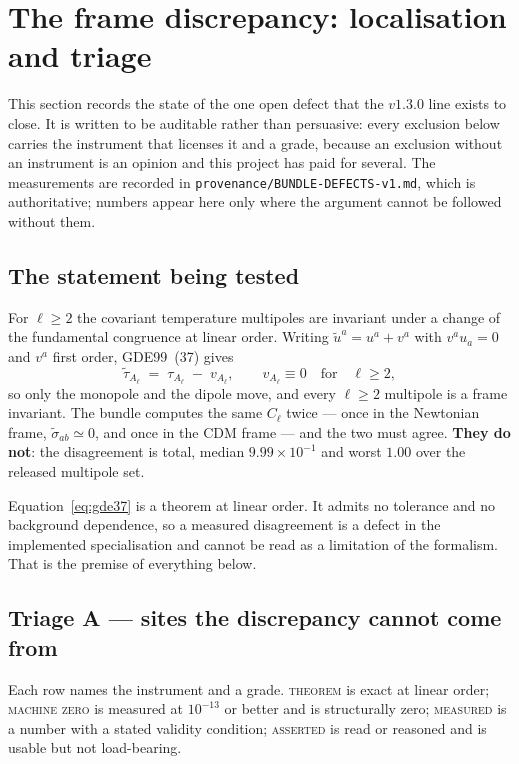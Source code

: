 \section{The frame discrepancy: localisation and triage}
\label{sec:frame-discrepancy}

\noindent
This section records the state of the one open defect that the $v1.3.0$ line
exists to close. It is written to be auditable rather than persuasive: every
exclusion below carries the instrument that licenses it and a grade, because
an exclusion without an instrument is an opinion and this project has paid for
several. The measurements are recorded in
\texttt{provenance/BUNDLE-DEFECTS-v1.md}, which is authoritative; numbers
appear here only where the argument cannot be followed without them.

\subsection{The statement being tested}
For $\ell\ge2$ the covariant temperature multipoles are invariant under a
change of the fundamental congruence at linear order. Writing
$\tilde u^a = u^a + v^a$ with $v^au_a=0$ and $v^a$ first order, GDE99~(37)
gives
\begin{equation}
  \tilde\tau_{A_\ell} \;=\; \tau_{A_\ell} \;-\; v_{A_\ell},
  \qquad v_{A_\ell}\equiv 0 \quad\text{for}\quad \ell\ge 2 ,
  \label{eq:gde37}
\end{equation}
so only the monopole and the dipole move, and every $\ell\ge2$ multipole is a
frame invariant. The bundle computes the same $C_\ell$ twice --- once in the
Newtonian frame, $\tilde\sigma_{ab}\simeq0$, and once in the CDM frame --- and
the two must agree. \textbf{They do not}: the disagreement is total, median
$9.99\times10^{-1}$ and worst $1.00$ over the released multipole set.

Equation~\eqref{eq:gde37} is a theorem at linear order. It admits no
tolerance and no background dependence, so a measured disagreement is a defect
in the implemented specialisation and cannot be read as a limitation of the
formalism. That is the premise of everything below.

\subsection{Triage A --- sites the discrepancy cannot come from}
Each row names the instrument and a grade. \textsc{theorem} is exact at linear
order; \textsc{machine zero} is measured at $10^{-13}$ or better and is
structurally zero; \textsc{measured} is a number with a stated validity
condition; \textsc{asserted} is read or reasoned and is usable but not
load-bearing.

